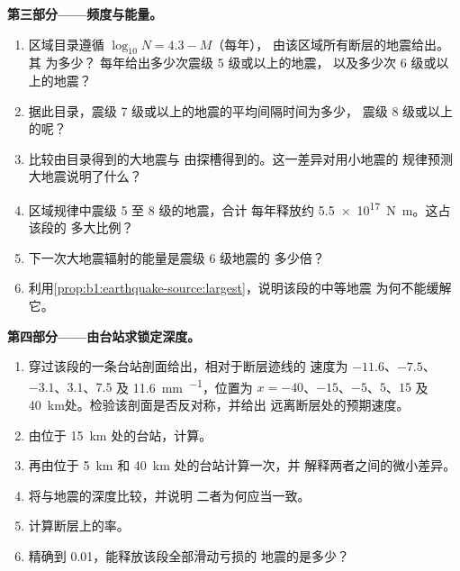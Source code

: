 \begin{problem}
\medskip
\noindent\textbf{第三部分——频度与能量。}
\begin{enumerate}[resume]
  \item 区域目录遵循 $\log_{10} N = 4.3 - M$（每年），
        由该区域所有断层的地震给出。其 为多少？
        每年给出多少次震级 5 级或以上的地震，
        以及多少次 6 级或以上的地震？
  \item 据此目录，震级 7 级或以上的地震的平均间隔时间为多少，
        震级 8 级或以上的呢？
  \item 比较由目录得到的大地震与
        由探槽得到的。这一差异对用小地震的
        规律预测大地震说明了什么？
  \item 区域规律中震级 5 至 8 级的地震，合计
        每年释放约 \qty{5.5e17}{N.m}。这占该段的
        多大比例？
  \item 下一次大地震辐射的能量是震级 6 级地震的
        多少倍？
  \item 利用\cref{prop:b1:earthquake-source:largest}，说明该段的中等地震
        为何不能缓解它。
\end{enumerate}

\medskip
\noindent\textbf{第四部分——由台站求锁定深度。}
\begin{enumerate}[resume]
  \item 穿过该段的一条台站剖面给出，相对于断层迹线的
        速度为 $-11.6$、$-7.5$、$-3.1$、$3.1$、$7.5$ 及
        \qty{11.6}{mm.^{-1}}，位置为 $x = -40$、$-15$、$-5$、$5$、$15$ 及
        \qty{40}{km}处。检验该剖面是否反对称，并给出
        远离断层处的预期速度。
  \item 由位于 \qty{15}{km} 处的台站，计算。
  \item 再由位于 \qty{5}{km} 和 \qty{40}{km} 处的台站计算一次，并
        解释两者之间的微小差异。
  \item 将与地震的深度比较，并说明
        二者为何应当一致。
  \item 计算断层上的率。
  \item 精确到 0.01，能释放该段全部滑动亏损的
        地震的是多少？
\end{enumerate}
\end{problem}
